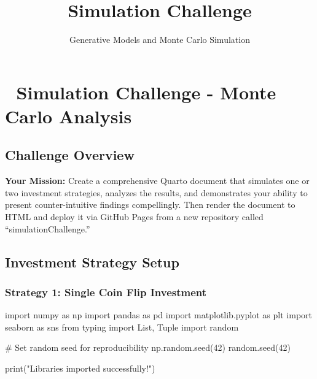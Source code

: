 \documentclass[
  letterpaper,
  DIV=11,
  numbers=noendperiod]{scrartcl}
\title{Simulation Challenge}
\subtitle{Generative Models and Monte Carlo Simulation}
\author{}
\date{}
\newenvironment{Shaded}{\begin{snugshade}}{\end{snugshade}}
\newcommand{\BuiltInTok}[1]{\textcolor[rgb]{0.00,0.23,0.31}{#1}}
\newcommand{\CommentTok}[1]{\textcolor[rgb]{0.37,0.37,0.37}{#1}}
\newcommand{\DecValTok}[1]{\textcolor[rgb]{0.68,0.00,0.00}{#1}}
\newcommand{\ImportTok}[1]{\textcolor[rgb]{0.00,0.46,0.62}{#1}}
\newcommand{\NormalTok}[1]{\textcolor[rgb]{0.00,0.23,0.31}{#1}}
\newcommand{\StringTok}[1]{\textcolor[rgb]{0.13,0.47,0.30}{#1}}
\begin{document}
\maketitle


\section{🎲 Simulation Challenge - Monte Carlo
Analysis}\label{simulation-challenge---monte-carlo-analysis}

\subsection{Challenge Overview}\label{challenge-overview}

\textbf{Your Mission:} Create a comprehensive Quarto document that
simulates one or two investment strategies, analyzes the results, and
demonstrates your ability to present counter-intuitive findings
compellingly. Then render the document to HTML and deploy it via GitHub
Pages from a new repository called ``simulationChallenge.''

\subsection{Investment Strategy Setup}\label{investment-strategy-setup}

\subsubsection{Strategy 1: Single Coin Flip
Investment}\label{strategy-1-single-coin-flip-investment}

\label{setup-imports}
\begin{Shaded}
\begin{Highlighting}[]
\ImportTok{import}\NormalTok{ numpy }\ImportTok{as}\NormalTok{ np}
\ImportTok{import}\NormalTok{ pandas }\ImportTok{as}\NormalTok{ pd}
\ImportTok{import}\NormalTok{ matplotlib.pyplot }\ImportTok{as}\NormalTok{ plt}
\ImportTok{import}\NormalTok{ seaborn }\ImportTok{as}\NormalTok{ sns}
\ImportTok{from}\NormalTok{ typing }\ImportTok{import}\NormalTok{ List, Tuple}
\ImportTok{import}\NormalTok{ random}

\CommentTok{\# Set random seed for reproducibility}
\NormalTok{np.random.seed(}\DecValTok{42}\NormalTok{)}
\NormalTok{random.seed(}\DecValTok{42}\NormalTok{)}

\BuiltInTok{print}\NormalTok{(}\StringTok{"Libraries imported successfully!"}\NormalTok{)}
\end{Highlighting}
\end{Shaded}
\end{document}
